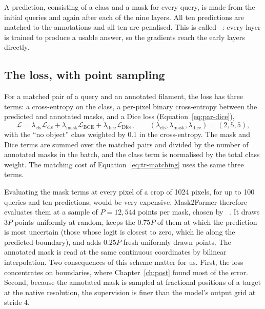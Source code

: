 A prediction, consisting of a class and a mask for every query, is made from the initial queries and
again after each of the nine layers. All ten predictions are matched to the annotations and all ten
are penalised. This is called ~\citep{lee2015dsn}: every layer is trained to produce a usable
answer, so the gradients reach the early layers directly.

\subsection{The loss, with point sampling}\label{sec:tr-loss}
For a matched pair of a query and an annotated filament, the loss has three terms: a cross-entropy on
the class, a per-pixel binary cross-entropy between the predicted and annotated masks, and a Dice loss
(Equation~\eqref{eq:par-dice}),
\begin{equation}
\mathcal{L} = \lambda_{\text{cls}}\mathcal{L}_{\text{cls}} + \lambda_{\text{mask}}\mathcal{L}_{\text{BCE}}
+ \lambda_{\text{dice}}\mathcal{L}_{\text{Dice}}, \qquad
(\lambda_{\text{cls}}, \lambda_{\text{mask}}, \lambda_{\text{dice}}) = (2, 5, 5),
\label{eq:tr-loss}
\end{equation}
with the ``no object'' class weighted by 0.1 in the cross-entropy. The mask and Dice terms are summed
over the matched pairs and divided by the number of annotated masks in the batch, and the class term is
normalised by the total class weight. The matching cost of Equation~\eqref{eq:tr-matching} uses the
same three terms.

Evaluating the mask terms at every pixel of a crop of 1024 pixels, for up to 100 queries and ten
predictions, would be very expensive. Mask2Former therefore evaluates them at a sample of $P = 12{,}544$
points per mask, chosen by ~\citep{pointrend}. It draws $3P$ points
uniformly at random, keeps the $0.75P$ of them at which the prediction is most uncertain (those whose
logit is closest to zero, which lie along the predicted boundary), and adds $0.25P$ fresh uniformly
drawn points. The annotated mask is read at the same continuous coordinates by bilinear interpolation.
Two consequences of this scheme matter for us. First, the loss concentrates on boundaries, where
Chapter~\ref{ch:post} found most of the error. Second, because the annotated mask is sampled at
fractional positions of a target at the native resolution, the supervision is finer than the model's
output grid at stride 4.

